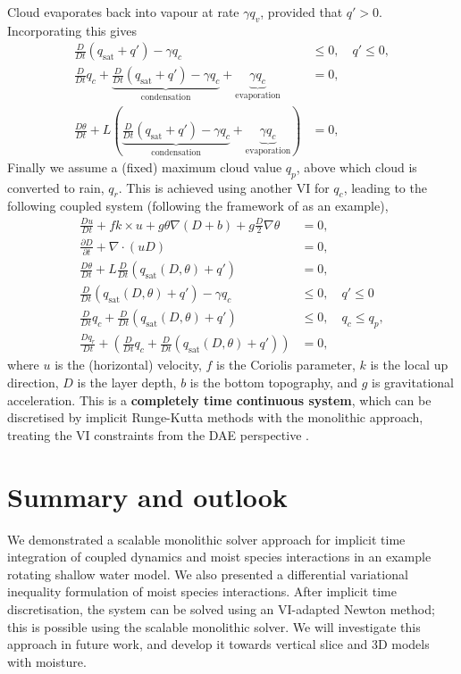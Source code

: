 \documentclass[
]{ImperialPoster}
\DeclareMathOperator{\sat}{sat}
\newcommand{\pp}[2]{\frac{\partial #1}{\partial #2}}
\newcommand{\DD}[2]{\frac{D #1}{D #2}}
\begin{document}
\begin{multicols}{3}
Cloud evaporates back into vapour at rate $\gamma q_v$, provided that
$q'>0$. Incorporating this gives
\begin{align*}
  \DD{}{t}(q_{\sat}+q') - \gamma q_c & \leq 0, \quad
  q' \leq 0, \\
  \DD{}{t}q_c + \underbrace{\DD{}{t}(q_{\sat}+q') - \gamma q_c}_{\mbox{condensation}} + \underbrace{\gamma q_c}_{\mbox{evaporation}} & = 0, \\
  \DD{\theta}{t} + L\left(
  \underbrace{\DD{}{t}(q_{\sat}+q') - \gamma q_c}_{\mbox{condensation}} + \underbrace{\gamma q_c}_{\mbox{evaporation}}\right) & = 0, 
\end{align*}
Finally we assume a (fixed) maximum cloud value $q_p$, above which
cloud is converted to rain, $q_r$. This is achieved using another VI
for $q_c$, leading to the following
coupled system (following the framework of \cite{zerroukat2015moist} as an example),
\begin{align*}
  \DD{u}{t} + fk\times u + g\theta \nabla (D+b) + g\frac{D}{2}\nabla \theta
  & = 0, \\
  \pp{D}{t} + \nabla\cdot(uD) & = 0, \\
  \DD{\theta}{t} + L\DD{}{t}(q_{\sat}(D,\theta)+q') & = 0, \\
  \DD{}{t}(q_{\sat}(D,\theta)+q') - \gamma q_c & \leq 0, \quad q'\leq 0 \\
  \DD{}{t}q_c + \DD{}{t}(q_{\sat}(D,\theta)+q') & \leq 0, \quad
  q_c \leq q_p, \\
  \DD{q_r}{t} + \left(\DD{}{t}q_c + \DD{}{t}(q_{\sat}(D,\theta)+q')\right) & = 0,
\end{align*}
where $u$ is the (horizontal) velocity, $f$ is the Coriolis parameter,
$k$ is the local up direction, $D$ is the layer depth, $b$ is the
bottom topography, and $g$ is gravitational acceleration. This is a
{\bfseries completely time continuous system}, which can be discretised by
implicit Runge-Kutta methods with the monolithic approach, treating
the VI constraints from the DAE perspective \cite{kirby2024extending}.

\section{Summary and outlook}

We demonstrated a scalable monolithic solver approach for implicit
time integration of coupled dynamics and moist species interactions in
an example rotating shallow water model.  We also presented a
differential variational inequality formulation of moist species
interactions. After implicit time discretisation, the system can be
solved using an VI-adapted Newton method; this is possible using the
scalable monolithic solver. We will investigate this approach in
future work, and develop it towards vertical slice and 3D models with
moisture.


\end{multicols}
\end{document}
